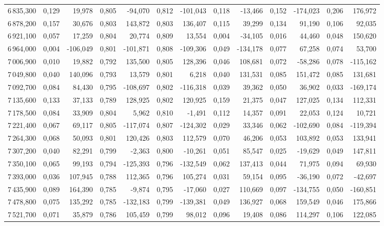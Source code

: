 \begin{longtable}{rrrrrrrrrrrrr}
6\,835,300 & 0,129 & 19,978 & 0,805 & -94,070 & 0,812 & -101,043 & 0,118 & -13,466 & 0,152 & -174,023 & 0,206 & 176,972\\
6\,878,200 & 0,157 & 30,676 & 0,803 & 143,872 & 0,803 & 136,407 & 0,115 & 39,299 & 0,134 & 91,190 & 0,106 & 92,035\\
6\,921,100 & 0,057 & 17,259 & 0,804 & 20,774 & 0,809 & 13,554 & 0,004 & -34,105 & 0,016 & 44,460 & 0,048 & 150,620\\
6\,964,000 & 0,004 & -106,049 & 0,801 & -101,871 & 0,808 & -109,306 & 0,049 & -134,178 & 0,077 & 67,258 & 0,074 & 53,700\\
7\,006,900 & 0,010 & 19,882 & 0,792 & 135,500 & 0,805 & 128,396 & 0,046 & 108,681 & 0,072 & -58,286 & 0,078 & -115,162\\
7\,049,800 & 0,040 & 140,096 & 0,793 & 13,579 & 0,801 & 6,218 & 0,040 & 131,531 & 0,085 & 151,472 & 0,085 & 131,681\\
7\,092,700 & 0,084 & 84,430 & 0,795 & -108,697 & 0,802 & -116,318 & 0,039 & 39,362 & 0,050 & 36,902 & 0,033 & -169,174\\
7\,135,600 & 0,133 & 37,133 & 0,789 & 128,925 & 0,802 & 120,925 & 0,159 & 21,375 & 0,047 & 127,025 & 0,134 & 112,331\\
7\,178,500 & 0,084 & 33,909 & 0,804 & 5,962 & 0,810 & -1,491 & 0,112 & 14,357 & 0,091 & 22,053 & 0,124 & 10,721\\
7\,221,400 & 0,067 & 69,117 & 0,805 & -117,074 & 0,807 & -124,302 & 0,029 & 33,346 & 0,062 & -102,690 & 0,084 & -119,394\\
7\,264,300 & 0,068 & 50,093 & 0,801 & 120,426 & 0,803 & 112,579 & 0,070 & 46,206 & 0,053 & 103,892 & 0,053 & 133,941\\
7\,307,200 & 0,040 & 82,291 & 0,799 & -2,363 & 0,800 & -10,261 & 0,051 & 85,547 & 0,025 & -19,629 & 0,049 & 147,811\\
7\,350,100 & 0,065 & 99,193 & 0,794 & -125,393 & 0,796 & -132,549 & 0,062 & 137,413 & 0,044 & 71,975 & 0,094 & 69,930\\
7\,393,000 & 0,036 & 107,945 & 0,788 & 112,365 & 0,796 & 105,274 & 0,031 & 59,154 & 0,095 & -36,190 & 0,072 & -42,697\\
7\,435,900 & 0,089 & 164,390 & 0,785 & -9,874 & 0,795 & -17,060 & 0,027 & 110,669 & 0,097 & -134,755 & 0,050 & -160,851\\
7\,478,800 & 0,075 & 135,292 & 0,785 & -132,183 & 0,799 & -139,381 & 0,049 & 136,927 & 0,068 & 159,549 & 0,046 & 175,866\\
7\,521,700 & 0,071 & 35,879 & 0,786 & 105,459 & 0,799 & 98,012 & 0,096 & 19,408 & 0,086 & 114,297 & 0,106 & 122,085\\

\end{longtable}
